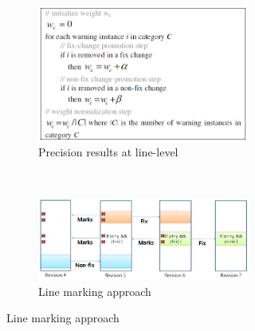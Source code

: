  \begin{figure}[H]
     \begin{subfigure}{0.6\textwidth}
         \begin{subfigure}{.5\textwidth}
             \centering
             \includegraphics[scale=0.45]{./src/which_warnings_weights.png}
             \caption{Precision results at line-level}\label{which_warnings:weights}
         \end{subfigure}\\
         \begin{subfigure}{.5\textwidth}
         \centering
         \includegraphics[scale=0.35]{./src/which_warnings_marking.png}
         \caption{Line marking approach}\label{which_warnings:marking}
         \end{subfigure}
     \end{subfigure}%
     \begin{subfigure}{0.4\textwidth}
         \centering

\end{subfigure}
\end{figure}
